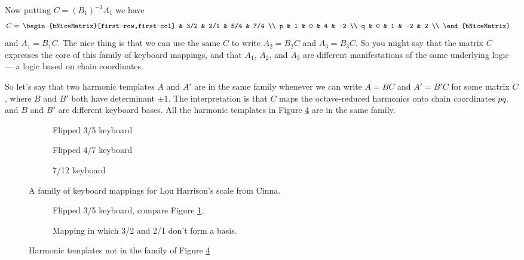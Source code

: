 \documentclass[a4paper,11pt]{article}
\newcommand\matspace{\:}
\begin{document}
Now putting $C = (B_1)^{-1} A_1$ we have
\begin{align}
C &=\matspace
\begin{bNiceMatrix}[first-row,first-col]
    &   3/2 &   2/1 &   5/4 &   7/4 \\
p   &   1   &   0   &   4   &   -2  \\
q   &   0   &   1   &   -2  &   2   \\
\end{bNiceMatrix}
\end{align}
and $A_1 = B_1 C$.  The nice thing is that we can use the same $C$ to write
$A_2 = B_2 C$ and $A_3 = B_3 C$.  So you might say that the matrix $C$
expresses the core of this family of keyboard mappings, and that $A_1$, $A_2$,
and $A_3$ are different manifestations of the same underlying logic --- a logic
based on chain coordinates.

So let's say that two harmonic templates $A$ and $A'$ are in the same family
whenever we can write $A = B C$ and $A' = B' C$ for some matrix $C$, where $B$
and $B'$ both have determinant $\pm1$. The interpretation is that $C$ maps the
octave-reduced harmonics onto chain coordinates $pq$, and $B$ and $B'$ are
different keyboard bases. All the harmonic templates in Figure \ref{fig:cinna}
are in the same family.

\begin{figure}
\begin{subfigure}{\textwidth}

\caption{Flipped 3/5 keyboard}
\label{fig:cinna-3-5}
\par\bigskip
\end{subfigure}
\begin{subfigure}{\textwidth}

\caption{Flipped 4/7 keyboard}
\label{fig:cinna-4-7}
\par\bigskip
\end{subfigure}
\begin{subfigure}{\textwidth}

\caption{7/12 keyboard}
\label{fig:cinna-7-12}
\par\bigskip
\end{subfigure}
\caption{A family of keyboard mappings for Lou Harrison's scale from Cinna.}
\label{fig:cinna}
\end{figure}

\begin{figure}
\begin{subfigure}{\textwidth}

\caption{Flipped 3/5 keyboard, compare Figure \ref{fig:cinna-3-5}.}
\label{fig:cinna-2-1}
\par\bigskip
\end{subfigure}
\begin{subfigure}{\textwidth}

\caption{Mapping in which 3/2 and 2/1 don't form a basis.}
\label{fig:cinna-2-2}
\par\bigskip
\end{subfigure}
\caption{Harmonic templates not in the family of Figure \ref{fig:cinna}}
\label{fig:cinna-2}
\end{figure}
\end{document}

